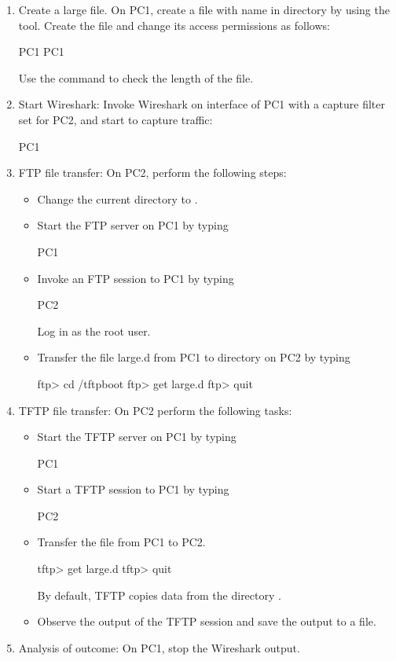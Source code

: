\begin{enumerate}
	\item Create a large file. On PC1, create a file with name  in directory  by using the  tool. Create the file and change its access permissions as follows:
		\begin{cmdblock}
	PC1%
	PC1%
		\end{cmdblock}
		Use the command  to check the length of the file.
	\item Start Wireshark: Invoke Wireshark on interface  of PC1 with a capture filter set for PC2, and start to capture traffic:
		\begin{cmdblock}
	PC1%
		\end{cmdblock}
	\item FTP file transfer: On PC2, perform the following steps:
		\begin{itemize}
			\item Change the current directory to .
			\item Start the FTP server on PC1 by typing
				\begin{cmdblock}
	PC1%
				\end{cmdblock}
			\item Invoke an FTP session to PC1 by typing
				\begin{cmdblock}
	PC2%
				\end{cmdblock}
				Log in as the root user.
			\item Transfer the file large.d from PC1 to directory  on PC2 by typing
				\begin{cmdblock}
	ftp> cd /tftpboot 
	ftp> get large.d 
	ftp> quit
				\end{cmdblock}
		\end{itemize}
	\item TFTP file transfer: On PC2 perform the following tasks:
		\begin{itemize}
			\item Start the TFTP server on PC1 by typing
				\begin{cmdblock}
	PC1%
				\end{cmdblock}
			\item Start a TFTP session to PC1 by typing 
				\begin{cmdblock}
	PC2%
				\end{cmdblock}
			\item Transfer the file  from PC1 to PC2. 
				\begin{cmdblock}
	tftp> get large.d
	tftp> quit
				\end{cmdblock}
				By default, TFTP copies data from the directory .
			\item Observe the output of the TFTP session and save the output to a file.
		\end{itemize}
	\item Analysis of outcome: On PC1, stop the Wireshark output.
\end{enumerate}

